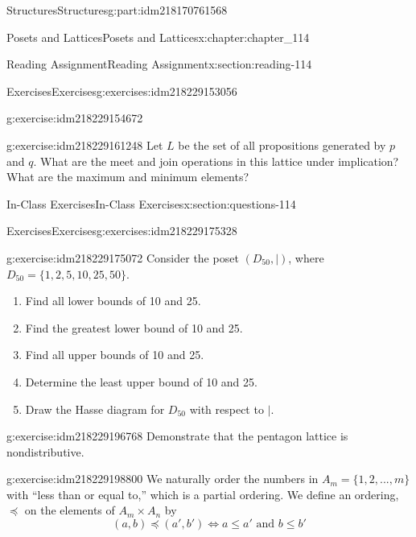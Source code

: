 \documentclass[oneside,10pt,]{book}
\numberwithin{equation}{section}
\begin{document}
\begin{partptx}{Structures}{}{Structures}{}{}{g:part:idm218170761568}
\begin{chapterptx}{Posets and Lattices}{}{Posets and Lattices}{}{}{x:chapter:chapter_114}
\begin{sectionptx}{Reading Assignment}{}{Reading Assignment}{}{}{x:section:reading-114}
\begin{exercises-subsection-numberless}{Exercises}{}{Exercises}{}{}{g:exercises:idm218229153056}
\begin{divisionexercise}{1}{}{}{g:exercise:idm218229154672}
\end{divisionexercise}%
\begin{divisionexercise}{2}{}{}{g:exercise:idm218229161248}%
Let \(L\) be the set of all propositions generated by \(p\) and \(q\).  What are the meet and join operations in this lattice under implication?   What are the maximum and minimum elements?%
\end{divisionexercise}%
\end{exercises-subsection-numberless}
\end{sectionptx}
%
%
\typeout{************************************************}
\typeout{************************************************}
%
\begin{sectionptx}{In-Class Exercises}{}{In-Class Exercises}{}{}{x:section:questions-114}
%
%
%
\typeout{************************************************}
\typeout{************************************************}
%
\begin{exercises-subsection-numberless}{Exercises}{}{Exercises}{}{}{g:exercises:idm218229175328}
\begin{divisionexercise}{1}{}{}{g:exercise:idm218229175072}%
Consider the poset \((D_{50},\mid)\), where \(D_{50} = \{1,2,5,10,25,50\}\).%
\begin{enumerate}[label=(\alph*)]
\item{}Find all lower bounds of 10 and 25.%
\item{}Find the greatest lower bound  of 10 and 25.%
\item{}Find all upper bounds of 10 and 25.%
\item{}Determine the least upper bound  of 10 and 25.%
\item{}Draw the Hasse diagram for \(D_{50}\) with respect to \(\mid\).%
\end{enumerate}
%
\end{divisionexercise}%
\begin{divisionexercise}{2}{}{}{g:exercise:idm218229196768}%
Demonstrate that the pentagon lattice is nondistributive.%
\end{divisionexercise}%
\begin{divisionexercise}{3}{}{}{g:exercise:idm218229198800}%
We naturally order the numbers in \(A_m = \{1, 2, . . . , m\}\) with ``less than or equal to,'' which is a partial ordering. We define an ordering, \(\preceq\)  on the elements of \(A_m \times  A_n\) by%
\begin{equation*}
(a, b) \preceq  (a', b') \Leftrightarrow a \leq  a' \textrm{ and } b \leq  b'

\end{equation*}
\end{divisionexercise}
\end{exercises-subsection-numberless}
\end{sectionptx}
\end{chapterptx}
\end{partptx}
\end{document}
